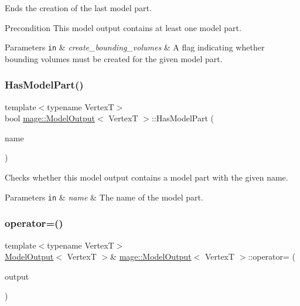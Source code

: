 Ends the creation of the last model part.

\begin{DoxyPrecond}{Precondition}
This model output contains at least one model part. 
\end{DoxyPrecond}

\begin{DoxyParams}[1]{Parameters}
\mbox{\tt in}  & {\em create\+\_\+bounding\+\_\+volumes} & A flag indicating whether bounding volumes must be created for the given model part. \\
\hline
\end{DoxyParams}
\hypertarget{structmage_1_1_model_output_a90c6d42d13813b9c340bd1a250276a8d}{}\label{structmage_1_1_model_output_a90c6d42d13813b9c340bd1a250276a8d} 
\subsubsection{\texorpdfstring{Has\+Model\+Part()}{HasModelPart()}}
{\footnotesize\ttfamily template$<$typename VertexT$>$ \\
bool \hyperlink{structmage_1_1_model_output}{mage\+::\+Model\+Output}$<$ VertexT $>$\+::Has\+Model\+Part (\begin{DoxyParamCaption}\item[{const string \&}]{name }\end{DoxyParamCaption})\hspace{0.3cm}{\ttfamily [noexcept]}}

Checks whether this model output contains a model part with the given name.


\begin{DoxyParams}[1]{Parameters}
\mbox{\tt in}  & {\em name} & The name of the model part. \\
\hline
\end{DoxyParams}
\hypertarget{structmage_1_1_model_output_ada52bf380c0259a0d7ef855457e5a9da}{}\label{structmage_1_1_model_output_ada52bf380c0259a0d7ef855457e5a9da} 
\subsubsection{\texorpdfstring{operator=()}{operator=()}\hspace{0.1cm}{\footnotesize\ttfamily [1/2]}}
{\footnotesize\ttfamily template$<$typename VertexT$>$ \\
\hyperlink{structmage_1_1_model_output}{Model\+Output}$<$ VertexT $>$\& \hyperlink{structmage_1_1_model_output}{mage\+::\+Model\+Output}$<$ VertexT $>$\+::operator= (\begin{DoxyParamCaption}\item[{const \hyperlink{structmage_1_1_model_output}{Model\+Output}$<$ VertexT $>$ \&}]{output }\end{DoxyParamCaption})\hspace{0.3cm}{\ttfamily [delete]}}

